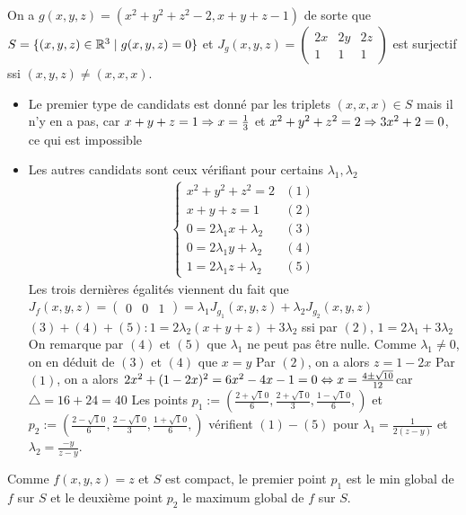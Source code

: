 \begin{resolution}
    On a $g(x,y,z) = (x^2 + y^2 + z^2 - 2,x+y+z - 1)$ de sorte que $S=\{(x,y,z)\in\mathbb{R}^3\mid g(x,y,z) = 0\} $
    et $J_g(x,y,z) = \begin{pmatrix}
        2x & 2y & 2z\\
        1&1&1
    \end{pmatrix}$ est surjectif ssi $(x,y,z)\ne(x,x,x)$.
    \begin{itemize}
        \item Le premier type de candidats est donné par les triplets $(x,x,x)\in 
        S$ mais il n'y en a pas, car $x+ y + z = 1\Rightarrow x=  \frac13 $ et $x^2+y^2+z^2 = 2\Rightarrow 3x^2 + 2 = 0$, ce qui est impossible
       \item Les autres candidats sont ceux vérifiant pour certains $\lambda_1,\lambda_2$    
    \begin{align*}
    \begin{cases}
        x^2+y^2+z^2 = 2 & (1)\\
        x+y+z = 1 &(2)\\
        0 = 2\lambda_1x + \lambda_2 & (3)\\
        0 = 2\lambda_1y + \lambda_2 &(4)\\
        1 = 2\lambda_1z + \lambda_2 &(5)
    \end{cases} 
    \end{align*}
    Les trois dernières égalités viennent du fait que $J_f(x,y,z) = \begin{pmatrix}
        0 & 0 & 1
    \end{pmatrix} = \lambda_1J_{g_1}(x,y,z) + \lambda_2J_{g_2}(x,y,z)$ 
    $(3) + (4) + (5) : 1 = 2\lambda_2(x+y+z) + 3\lambda_2$ ssi par $(2)$, $1 = 2\lambda_1 + 3\lambda_2$
    On remarque par $(4)$ et $(5)$ que $\lambda_1$ ne peut pas être nulle.
    Comme $\lambda_1 \ne 0$, on en déduit de $(3)$ et $(4)$ que $x = y$ 
    Par $(2)$, on a alors $z = 1-2x$
    Par $(1)$, on a alors $2x^2 + (1-2x)^2 = 6x^2 - 4x - 1 = 0\Leftrightarrow x =\frac{4\pm\sqrt{10}}{12} $car $\triangle = 16+24 = 40$
    Les points $p_1 :=(\frac{2+\sqrt10}{6},\frac{2+\sqrt10}{3},\frac{1-\sqrt10}{6},)$ et 
    $p_2 :=(\frac{2-\sqrt10}{6},\frac{2-\sqrt10}{3},\frac{1+\sqrt10}{6},)$ vérifient $(1)-(5)$
    pour $\lambda_1 = \frac{1}{2(z-y)}$ et $\lambda_2 = \frac{-y}{z-y}$.
    \end{itemize}
    Comme $f(x,y,z) = z$ et $S$ est compact, le premier point $p_1$ est le min global de $f$ sur $S$ et le deuxième point $p_2$ le maximum global de $f$ sur $S$.
\end{resolution}

